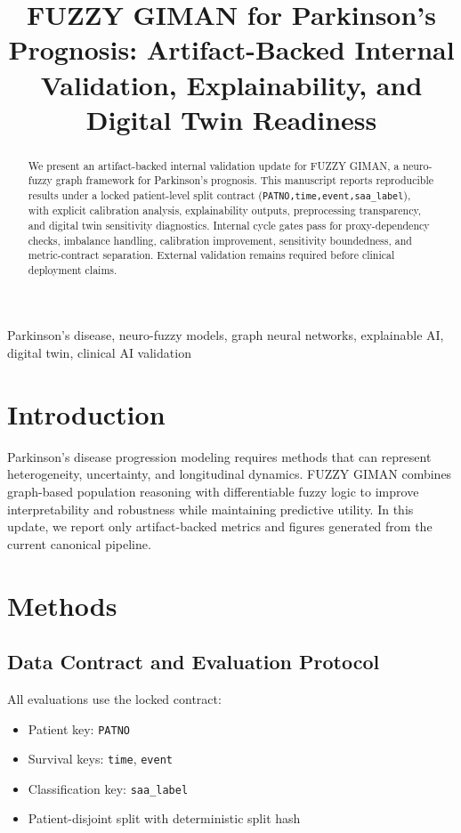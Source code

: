\documentclass[conference]{IEEEtran}
\begin{document}
\title{FUZZY GIMAN for Parkinson's Prognosis: Artifact-Backed Internal Validation, Explainability, and Digital Twin Readiness}

\author{
}

\maketitle

\begin{abstract}
We present an artifact-backed internal validation update for FUZZY GIMAN, a neuro-fuzzy graph framework for Parkinson's prognosis. This manuscript reports reproducible results under a locked patient-level split contract (\texttt{PATNO,time,event,saa\_label}), with explicit calibration analysis, explainability outputs, preprocessing transparency, and digital twin sensitivity diagnostics. Internal cycle gates pass for proxy-dependency checks, imbalance handling, calibration improvement, sensitivity boundedness, and metric-contract separation. External validation remains required before clinical deployment claims.
\end{abstract}

\begin{IEEEkeywords}
Parkinson's disease, neuro-fuzzy models, graph neural networks, explainable AI, digital twin, clinical AI validation
\end{IEEEkeywords}

\section{Introduction}
Parkinson's disease progression modeling requires methods that can represent heterogeneity, uncertainty, and longitudinal dynamics. FUZZY GIMAN combines graph-based population reasoning with differentiable fuzzy logic to improve interpretability and robustness while maintaining predictive utility. In this update, we report only artifact-backed metrics and figures generated from the current canonical pipeline.

\section{Methods}
\subsection{Data Contract and Evaluation Protocol}
All evaluations use the locked contract:
\begin{itemize}
\item Patient key: \texttt{PATNO}
\item Survival keys: \texttt{time}, \texttt{event}
\item Classification key: \texttt{saa\_label}
\item Patient-disjoint split with deterministic split hash
\end{itemize}
\end{document}
